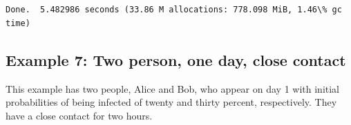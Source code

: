 \documentclass[11pt]{article}
\begin{document}
    \begin{center}
    \end{center}
    { \hspace*{\fill} \\}
    
    \begin{Verbatim}[commandchars=\\\{\}]

Done.  5.482986 seconds (33.86 M allocations: 778.098 MiB, 1.46\% gc time)
    \end{Verbatim}
\newpage
    \hypertarget{example-7-two-person-one-day-close-contact}{%
\subsection{Example 7: Two person, one day, close
contact}\label{example-7-two-person-one-day-close-contact}}

This example has two people, Alice and Bob, who appear on day 1 with
initial probabilities of being infected of twenty and thirty percent,
respectively. They have a close contact for two hours.
\end{document}
